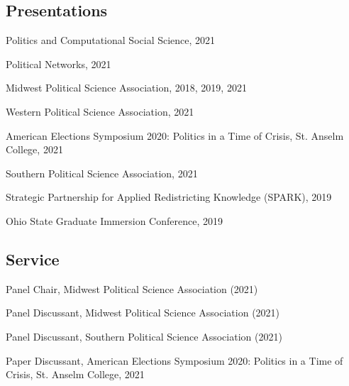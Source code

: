 \documentclass[letterpaper]{article}
\renewenvironment{itemize}{
  \begin{list}{}{
    \setlength{\leftmargin}{1.5em}
  }
}{
  \end{list}
}
\begin{document}
\subsection*{Presentations}
\begin{itemize}

\item Politics and Computational Social Science, 2021

\item Political Networks, 2021

\item Midwest Political Science Association, 2018, 2019, 2021

\item Western Political Science Association, 2021

\item American Elections Symposium 2020: Politics in a Time of Crisis, St. Anselm College, 2021

\item Southern Political Science Association, 2021

\item Strategic Partnership for Applied Redistricting Knowledge (SPARK), 2019

\item Ohio State Graduate Immersion Conference, 2019
\end{itemize}

\subsection*{Service}
\begin{itemize}

\item Panel Chair, Midwest Political Science Association (2021)

\item Panel Discussant, Midwest Political Science Association (2021)

\item Panel Discussant, Southern Political Science Association (2021)

\item Paper Discussant, American Elections Symposium 2020: Politics in a Time of Crisis, St. Anselm College, 2021

\end{itemize}
\end{document}

